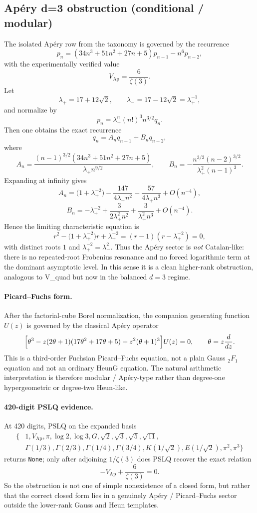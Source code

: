 \documentclass[11pt]{article}
\begin{document}
\subsection{Ap\'ery d=3 obstruction (conditional / modular)}\label{subsec:apery-outline}
The isolated Ap\'ery row from the taxonomy is governed by the recurrence
\[
  p_n = (34n^3+51n^2+27n+5)p_{n-1} - n^6 p_{n-2},
\]
with the experimentally verified value
\[
  V_{\mathrm{Ap}} = \frac{6}{\zeta(3)}.
\]
Let
\[
  \lambda_+ = 17+12\sqrt2, \qquad \lambda_- = 17-12\sqrt2 = \lambda_+^{-1},
\]
and normalize by
\[
  p_n = \lambda_+^n (n!)^3 n^{3/2} q_n.
\]
Then one obtains the exact recurrence
\[
  q_n = A_n q_{n-1} + B_n q_{n-2},
\]
where
\[
  A_n = \frac{(n-1)^{3/2}(34n^3+51n^2+27n+5)}{\lambda_+ n^{9/2}},
  \qquad
  B_n = -\frac{n^{3/2}(n-2)^{3/2}}{\lambda_+^2 (n-1)^3}.
\]
Expanding at infinity gives
\[
  A_n = \bigl(1+\lambda_+^{-2}\bigr) - \frac{147}{4\lambda_+ n^2} - \frac{57}{4\lambda_+ n^3} + O(n^{-4}),
\]
\[
  B_n = -\lambda_+^{-2} + \frac{3}{2\lambda_+^2 n^2} + \frac{3}{\lambda_+^2 n^3} + O(n^{-4}).
\]
Hence the limiting characteristic equation is
\[
  r^2 - \bigl(1+\lambda_+^{-2}\bigr)r + \lambda_+^{-2} = (r-1)(r-\lambda_+^{-2}) = 0,
\]
with distinct roots $1$ and $\lambda_+^{-2} = \lambda_-^2$. Thus the Ap\'ery sector is \emph{not} Catalan-like: there is no repeated-root Frobenius resonance and no forced logarithmic term at the dominant asymptotic level. In this sense it is a clean higher-rank obstruction, analogous to V\_quad but now in the balanced $d=3$ regime.

\paragraph{Picard--Fuchs form.}
After the factorial-cube Borel normalization, the companion generating function $U(z)$ is governed by the classical Ap\'ery operator
\[
  \Bigl[\theta^3 - z(2\theta+1)(17\theta^2+17\theta+5) + z^2(\theta+1)^3\Bigr]U(z)=0,
  \qquad \theta = z\frac{d}{dz}.
\]
This is a third-order Fuchsian Picard--Fuchs equation, not a plain Gauss ${}_2F_1$ equation and not an ordinary HeunG equation. The natural arithmetic interpretation is therefore modular / Ap\'ery-type rather than degree-one hypergeometric or degree-two Heun-like.

\paragraph{420-digit PSLQ evidence.}
At 420 digits, PSLQ on the expanded basis
\[
\begin{aligned}
\{&1, V_{\mathrm{Ap}}, \pi, \log 2, \log 3, G, \sqrt2, \sqrt3, \sqrt5, \sqrt{11},\\
&\Gamma(1/3), \Gamma(2/3), \Gamma(1/4), \Gamma(3/4), K(1/\sqrt2), E(1/\sqrt2), \pi^2, \pi^3\}
\end{aligned}
\]
returns \texttt{None}; only after adjoining $1/\zeta(3)$ does PSLQ recover the exact relation
\[
  -V_{\mathrm{Ap}} + \frac{6}{\zeta(3)} = 0.
\]
So the obstruction is not one of simple nonexistence of a closed form, but rather that the correct closed form lies in a genuinely Ap\'ery / Picard--Fuchs sector outside the lower-rank Gauss and Heun templates.
\end{document}
